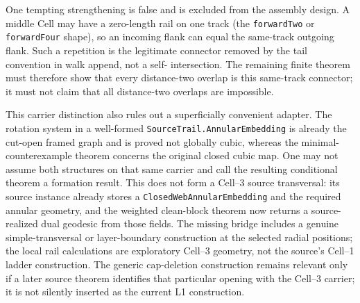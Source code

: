 \documentclass[11pt]{article}
\theoremstyle{definition}
\begin{document}
One tempting strengthening is false and is excluded from the assembly design.
A middle Cell may have a zero-length rail on one track (the
\texttt{forwardTwo} or \texttt{forwardFour} shape), so an incoming flank can
equal the same-track outgoing flank.  Such a repetition is the legitimate
connector removed by the tail convention in walk append, not a self-
intersection.  The remaining finite theorem must therefore show that every
distance-two overlap is this same-track connector; it must not claim that all
distance-two overlaps are impossible.

This carrier distinction also rules out a superficially convenient adapter.
The rotation system in a well-formed \texttt{SourceTrail.AnnularEmbedding} is
already the cut-open framed graph and is proved not globally cubic, whereas
the minimal-counterexample theorem concerns the original closed cubic map.
One may not assume both structures on that same carrier and call the resulting
conditional theorem a formation result.  This does not form a Cell--3 source
transversal: its source instance already stores a
\texttt{ClosedWebAnnularEmbedding} and the required annular geometry, and the
weighted clean-block theorem now returns a source-realized dual geodesic from
those fields.  The missing bridge includes a genuine simple-transversal or
layer-boundary construction at the selected radial positions; the local rail
calculations are exploratory Cell--3 geometry, not the source's Cell--1
ladder construction.  The generic
cap-deletion construction remains relevant only if a later source theorem
identifies that particular opening with the Cell--3 carrier; it is not silently
inserted as the current L1 construction.
\end{document}
